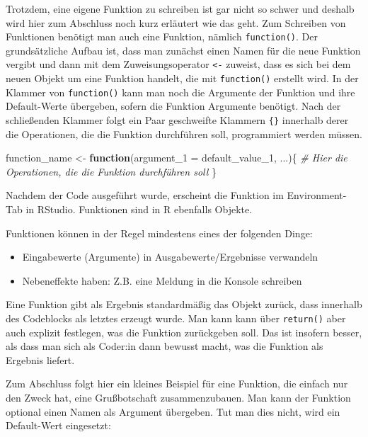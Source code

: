 \documentclass[
]{book}
\newenvironment{Shaded}{\begin{snugshade}}{\end{snugshade}}
\newcommand{\AttributeTok}[1]{\textcolor[rgb]{0.77,0.63,0.00}{#1}}
\newcommand{\CommentTok}[1]{\textcolor[rgb]{0.56,0.35,0.01}{\textit{#1}}}
\newcommand{\ControlFlowTok}[1]{\textcolor[rgb]{0.13,0.29,0.53}{\textbf{#1}}}
\newcommand{\NormalTok}[1]{#1}
\newcommand{\OtherTok}[1]{\textcolor[rgb]{0.56,0.35,0.01}{#1}}
\begin{document}
Trotzdem, eine eigene Funktion zu schreiben ist gar nicht so schwer und deshalb wird hier zum Abschluss noch kurz erläutert wie das geht. Zum Schreiben von Funktionen benötigt man auch eine Funktion, nämlich \texttt{function()}. Der grundsätzliche Aufbau ist, dass man zunächst einen Namen für die neue Funktion vergibt und dann mit dem Zuweisungsoperator \texttt{\textless{}-} zuweist, dass es sich bei dem neuen Objekt um eine Funktion handelt, die mit \texttt{function()} erstellt wird. In der Klammer von \texttt{function()} kann man noch die Argumente der Funktion und ihre Default-Werte übergeben, sofern die Funktion Argumente benötigt. Nach der schließenden Klammer folgt ein Paar geschweifte Klammern \texttt{\{\}} innerhalb derer die Operationen, die die Funktion durchführen soll, programmiert werden müssen.

\begin{Shaded}
\begin{Highlighting}[]
\NormalTok{function\_name }\OtherTok{\textless{}{-}} \ControlFlowTok{function}\NormalTok{(}\AttributeTok{argument\_1 =}\NormalTok{ default\_value\_1, ...)\{}
  \CommentTok{\# Hier die Operationen, die die Funktion durchführen soll}
\NormalTok{  \}}
\end{Highlighting}
\end{Shaded}

Nachdem der Code ausgeführt wurde, erscheint die Funktion im Environment-Tab in RStudio. Funktionen sind in R ebenfalls Objekte.

Funktionen können in der Regel mindestens eines der folgenden Dinge:

\begin{itemize}
\item
  Eingabewerte (Argumente) in Ausgabewerte/Ergebnisse verwandeln
\item
  Nebeneffekte haben: Z.B. eine Meldung in die Konsole schreiben
\end{itemize}

Eine Funktion gibt als Ergebnis standardmäßig das Objekt zurück, dass innerhalb des Codeblocks als letztes erzeugt wurde. Man kann kann über \texttt{return()} aber auch explizit festlegen, was die Funktion zurückgeben soll. Das ist insofern besser, als dass man sich als Coder:in dann bewusst macht, was die Funktion als Ergebnis liefert.

Zum Abschluss folgt hier ein kleines Beispiel für eine Funktion, die einfach nur den Zweck hat, eine Grußbotschaft zusammenzubauen. Man kann der Funktion optional einen Namen als Argument übergeben. Tut man dies nicht, wird ein Default-Wert eingesetzt:
\end{document}
